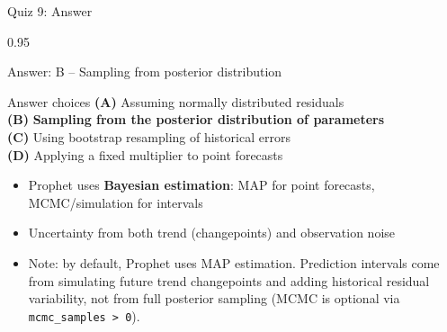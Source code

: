 \documentclass[9pt, aspectratio=169, t]{beamer}
\begin{document}
\begin{frame}{Quiz 9: Answer}
    \begin{cminipage}{0.95\textwidth}
    \begin{exampleblock}{Answer: B -- Sampling from posterior distribution}

    \begin{block}{Answer choices}
        \textcolor{MainBlue}{\textbf{(A)}} Assuming normally distributed residuals \incorrect\\[3pt]
        \textcolor{MainBlue}{\textbf{(B)}} \textbf{\textcolor{Forest}{Sampling from the posterior distribution of parameters}} \correct\\[3pt]
        \textcolor{MainBlue}{\textbf{(C)}} Using bootstrap resampling of historical errors \incorrect\\[3pt]
        \textcolor{MainBlue}{\textbf{(D)}} Applying a fixed multiplier to point forecasts \incorrect
    \end{block}

        \vspace{0.3cm}

        \begin{itemize}\setlength{\itemsep}{0pt}
            \item Prophet uses \textbf{Bayesian estimation}: MAP for point forecasts, MCMC/simulation for intervals
            \item Uncertainty from both trend (changepoints) and observation noise
            \item Note: by default, Prophet uses MAP estimation. Prediction intervals come from simulating future trend changepoints and adding historical residual variability, not from full posterior sampling (MCMC is optional via \texttt{mcmc\_samples > 0}).
        \end{itemize}
    \end{exampleblock}

    \end{cminipage}
\end{frame}
\end{document}
